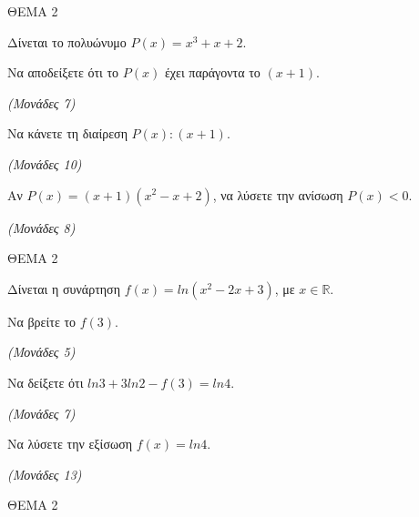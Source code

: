 \documentclass[11pt,a4paper,twoside]{book}
\newcommand{\monades}[1]{\hfill \textit{(Μονάδες #1)}}
\begin{document}
\vspace{4mm}

ΘΕΜΑ 2

Δίνεται το πολυώνυμο $P(x) = x^{3} + x + 2$.

\begin{alist}
\item

\end{alist}
\begin{alist}
\item
  Να αποδείξετε ότι το $P(x)$ έχει παράγοντα το $(x + 1)$.

\monades{7}


\end{alist}
\begin{alist}
\item
  Να κάνετε τη διαίρεση $P(x):(x + 1)$.

\monades{10}

\item Αν $P(x) = (x + 1)(x^{2} - x + 2)$, να λύσετε την ανίσωση $P(x) < 0$.

\monades{8}
\end{alist}

\vspace{4mm}

ΘΕΜΑ 2

Δίνεται η συνάρτηση $f(x) = ln(x^{2} - 2x + 3)$, με $x\mathbb{\in R}$.

\begin{alist}
\item Να βρείτε το $f(3)$.

\monades{5}

\item Να δείξετε ότι $ln3 + 3ln2 - f(3) = ln4$.

\monades{7}

\item Να λύσετε την εξίσωση $f(x) = ln4$.

\monades{13}
\end{alist}

\vspace{4mm}

ΘΕΜΑ 2
\end{document}
